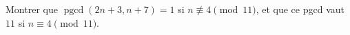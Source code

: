 Montrer que $\operatorname{pgcd}(2n + 3, n + 7) = 1$ si $n \not\equiv 4 \pmod{11}$, et que ce pgcd vaut $11$ si $n \equiv 4 \pmod{11}$.
